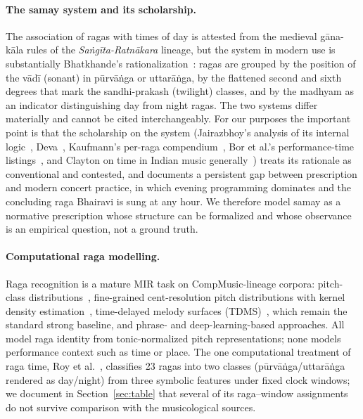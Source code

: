 \documentclass[11pt]{article}
\begin{document}
\paragraph{The samay system and its scholarship.}
The association of ragas with times of day is attested from the medieval
g\=ana-k\=ala rules of the \emph{Sa\.ng\=ita-Ratn\=akara} lineage, but the
system in modern use is substantially Bhatkhande's
rationalization~\cite{bhatkhande}: ragas are grouped by the position of the
v\=ad\=i (sonant) in p\=urv\=a\.nga or uttar\=a\.nga, by the flattened second
and sixth degrees that mark the sandhi-prakash (twilight) classes, and by the
madhyam as an indicator distinguishing day from night ragas. The two systems
differ materially and cannot be cited interchangeably. For our purposes the
important point is that the scholarship on the system (Jairazbhoy's analysis
of its internal logic~\cite{jairazbhoy}, Deva~\cite{deva}, Kaufmann's
per-raga compendium~\cite{kaufmann}, Bor et al.'s performance-time
listings~\cite{ragaguide}, and Clayton on time in Indian music
generally~\cite{clayton}) treats its rationale as conventional and contested,
and documents a persistent gap between prescription and modern concert
practice, in which evening programming dominates and the concluding raga
Bhairavi is sung at any hour. We therefore model samay as a normative
prescription whose structure can be formalized and whose observance is an
empirical question, not a ground truth.

\paragraph{Computational raga modelling.}
Raga recognition is a mature MIR task on CompMusic-lineage corpora:
pitch-class distributions~\cite{chordia2007}, fine-grained cent-resolution
pitch distributions with kernel density estimation~\cite{koduri2012},
time-delayed melody surfaces (TDMS)~\cite{gulati2016}, which remain the
standard strong baseline, and phrase- and deep-learning-based approaches. All
model raga identity from tonic-normalized pitch representations; none models
performance context such as time or place. The one computational treatment of
raga time, Roy et al.~\cite{roy2017}, classifies 23 ragas into two classes
(p\=urv\=a\.nga/uttar\=a\.nga rendered as day/night) from three symbolic
features under fixed clock windows; we document in Section~\ref{sec:table}
that several of its raga--window assignments do not survive comparison with
the musicological sources.
\end{document}
